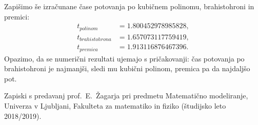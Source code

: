 \documentclass[a4paper]{article}
\begin{document}
Zapišimo še izračunane čase potovanja po kubičnem polinomu, brahistohroni in premici:
\begin{align*}
t_{polinom} &= 1.800452978985828, \\
t_{brahistohrona} &= 1.657073117759419, \\
t_{premica} &= 1.913116876467396.
\end{align*}
%
Opazimo, da se numerični rezultati ujemajo s pričakovanji: čas potovanja po brahistohroni je najmanjši, sledi mu kubični polinom, premica pa da najdaljšo pot.


\begin{thebibliography}{99}

 Zapiski s predavanj prof.~E.~Žagarja pri predmetu Matematično modeliranje, Univerza v Ljubljani, Fakulteta za matematiko in fiziko (študijsko leto 2018/2019).

\end{thebibliography}
\end{document}

